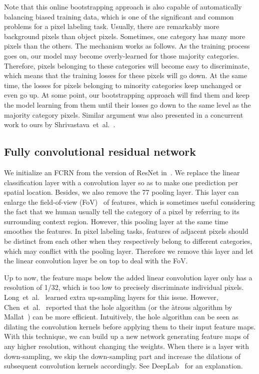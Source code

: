 \documentclass{article}
\begin{document}
Note that this online bootstrapping approach is also capable of automatically balancing biased training data,
which is one of the significant and common problems for a pixel labeling task.
Usually, there are remarkably more background pixels than object pixels.
Sometimes, one category has many more pixels than the others.
The mechanism works as follows.
As the training process goes on, our model may become overly-learned for those majority categories.
Therefore, pixels belonging to these categories will become easy to discriminate,
which means that the training losses for these pixels will go down.
At the same time, the losses for pixels belonging to minority categories keep unchanged or even go up.
At some point, our bootstrapping approach will find them and keep the model learning from them
until their losses go down to the same level as the majority category pixels.
Similar argument was also presented in a concurrent work to ours by Shrivastava~et~al.~\cite{OHEM.ICLR.2016.Loshchilov}.





\subsection{Fully convolutional residual network}


We initialize an FCRN from the version of ResNet in~\cite{ResNet.CVPR.2016.He}.
We replace the linear classification layer with a convolution layer so as to make one prediction per spatial
location.
Besides, we also remove the 77 pooling layer.
This layer can enlarge the field-of-view (FoV)~\cite{DeepLab.ICLR.2015.Chen} of features,
which is sometimes useful considering the fact that we human usually tell the category of a pixel by referring
to its surrounding context region.
However, this pooling layer at the same time smoothes the features.
In pixel labeling tasks, features of adjacent pixels should be distinct from each other when they respectively
belong to different categories, which may conflict with the pooling layer.
Therefore we remove this layer and let the linear convolution layer be  on top to deal with the FoV.



Up to now, the feature maps below the added linear convolution layer only has a resolution of 1/32,
which is too low to precisely discriminate individual pixels.
Long~et~al.~\cite{FCN.CVPR.2015.Long} learned extra up-sampling layers for this issue.
However, Chen~et~al.~\cite{DeepLab.ICLR.2015.Chen} reported that
the hole algorithm (or the \`{a}trous algorithm by Mallat~\cite{WaveletTour.2008.Mallat})  can be  more efficient.
Intuitively, the hole algorithm can be seen as dilating the convolution kernels before applying them to their input feature maps.
With this technique, we can build up a new network generating feature maps of any higher resolution, without changing the weights.
When there is a layer with down-sampling, we
skip the down-sampling part and increase the dilations of subsequent convolution kernels accordingly.
See DeepLab~\cite{DeepLab.ICLR.2015.Chen} for an explanation.
\end{document}
